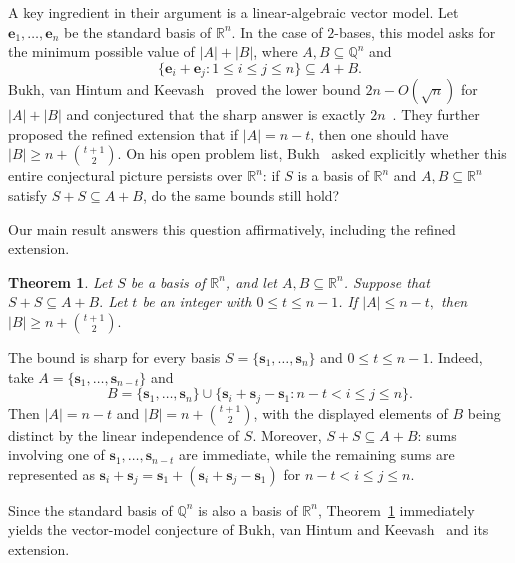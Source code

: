 \documentclass[11pt]{article}
\newtheorem{theorem}{Theorem}[section]
\theoremstyle{definition}
\begin{document}
A key ingredient in their argument is a linear-algebraic vector model. Let \(\boldsymbol{e}_{1},\ldots,\boldsymbol{e}_{n}\) be the standard basis of \(\mathbb{R}^{n}.\) In the case of \(2\)-bases, this model asks for the minimum possible value of \(|A|+|B|\), where \(A,B\subseteq \mathbb{Q}^{n}\) and
\[
    \{\boldsymbol{e}_i+\boldsymbol{e}_j:1\le i\le j\le n\}\subseteq A+B.
\]
Bukh, van Hintum and Keevash~\cite{2025ATCAarith} proved the lower bound \(2n-O(\sqrt n)\) for \(|A|+|B|\) and conjectured that the sharp answer is exactly \(2n\)~\cite[Conjecture~13]{2025ATCAarith}.  They further proposed the refined extension that if \(|A|=n-t\), then one should have
\(
    |B|\ge n+\binom{t+1}{2}.
\)
On his open problem list, Bukh~\cite[Problem~12]{BukhProblems} asked explicitly whether this entire conjectural picture persists over \(\mathbb{R}^{n}\): if \(S\) is a basis of \(\mathbb{R}^{n}\) and \(A,B\subseteq \mathbb{R}^{n}\) satisfy \(S+S\subseteq A+B\), do the same bounds still hold?

Our main result answers this question affirmatively, including the refined extension.

\begin{theorem}\label{thm:main}
Let \(S\) be a basis of \(\mathbb{R}^{n}\), and let \(A,B\subseteq \mathbb{R}^{n}\). Suppose that
\(
    S+S\subseteq A+B.
\)
Let \(t\) be an integer with \(0\le t\le n-1\). If
\(
    |A|\le n-t,
\)
then
\(
    |B|\ge n+\binom{t+1}{2}.
\)
\end{theorem}

The bound is sharp for every basis \(S=\{\boldsymbol{s}_1,\dots,\boldsymbol{s}_n\}\) and \(0\le t\le n-1\).  Indeed, take
\(
    A=\{\boldsymbol{s}_1,\dots,\boldsymbol{s}_{n-t}\}
\)
and
\[
    B=\{\boldsymbol{s}_1,\dots,\boldsymbol{s}_n\}
    \cup
    \{\boldsymbol{s}_i+\boldsymbol{s}_j-\boldsymbol{s}_1:n-t<i\le j\le n\}.
\]
Then \(|A|=n-t\) and \(|B|=n+\binom{t+1}{2}\), with the displayed elements of \(B\) being distinct by the linear independence of \(S\). Moreover, \(S+S\subseteq A+B\): sums involving one of \(\boldsymbol{s}_1,\dots,\boldsymbol{s}_{n-t}\) are immediate, while the remaining sums are represented as
\(
    \boldsymbol{s}_i+\boldsymbol{s}_j
    =
    \boldsymbol{s}_1+(\boldsymbol{s}_i+\boldsymbol{s}_j-\boldsymbol{s}_1)\) for
    \(n-t<i\le j\le n\).

Since the standard basis of \(\mathbb{Q}^{n}\) is also a basis of \(\mathbb{R}^{n}\), Theorem~\ref{thm:main} immediately yields the vector-model conjecture of Bukh, van Hintum and Keevash~\cite[Conjecture~13]{2025ATCAarith} and its extension.
\end{document}

